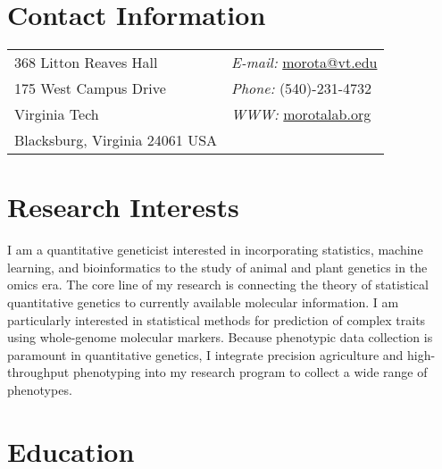 \documentclass[margin,line,10pt]{res}
\begin{document}

\begin{resume}
\section{\sc Contact Information}
\vspace{.05in}
\begin{tabular}{@{}p{2in}p{4in}}
368 Litton Reaves Hall  & \hspace{2.5cm} {\it E-mail:}  \href{mailto:morota@vt.edu}{morota@vt.edu} \\       
 175 West Campus Drive  & \hspace{2.5cm} {\it Phone:} (540)-231-4732\\     
Virginia Tech  & \hspace{2.5cm} {\it WWW:} \textcolor{blue}{\href{http://morotalab.org/}{morotalab.org}  }\\
Blacksburg, Virginia 24061 USA  & \\
\end{tabular}


\vspace{0.4cm}
\section{\sc Research Interests}
I am a quantitative geneticist interested in incorporating statistics, machine learning, and bioinformatics to the study of animal and plant genetics in the omics era. The core line of my research is connecting the theory of statistical quantitative genetics to currently available molecular information. 
I am particularly interested in statistical methods for prediction of complex traits using whole-genome molecular markers. Because phenotypic data collection is paramount in quantitative genetics, I integrate precision agriculture and high-throughput phenotyping into my research program to collect a wide range of phenotypes. 


\vspace{0.4cm}
\section{\sc Education}


\end{resume}
\end{document}
